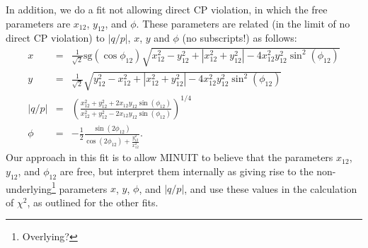 In addition, we do a fit not allowing direct CP violation, in which the
free parameters are $x_{12}$, $y_{12}$, and $\phi$. These parameters are related
(in the limit of no direct CP violation) to $|q/p|$, $x$, $y$ and $\phi$ (no subscripts!) as follows:
\begin{eqnarray}
x &=& \frac{1}{\sqrt{2}}\mathrm{sg}(\cos\phi_{12})
\sqrt{x_{12}^2 - y_{12}^2 + |x_{12}^2+y_{12}^2| - 4x_{12}^2y_{12}^2\sin^2(\phi_{12})} \\
%
y &=& \frac{1}{\sqrt{2}}
\sqrt{y_{12}^2 - x_{12}^2 + |x_{12}^2+y_{12}^2| - 4x_{12}^2y_{12}^2\sin^2(\phi_{12})} \\
%
|q/p| &=& \left(\frac{x_{12}^2+y_{12}^2+2x_{12}y_{12}\sin(\phi_{12})}
{x_{12}^2+y_{12}^2-2x_{12}y_{12}\sin(\phi_{12})}\right)^{1/4}\\
%
\phi &=& -\frac{1}{2}\frac{\sin(2\phi_{12})}{\cos(2\phi_{12})+\frac{y_{12}^2}{x_{12}^2}}.
\end{eqnarray}
Our approach in this fit is to allow MINUIT to believe that the parameters $x_{12}$, $y_{12}$,
and $\phi_{12}$ are free, but interpret them internally as giving rise to the 
non-underlying\footnote{Overlying?} parameters $x$, $y$, $\phi$, and $|q/p|$, and use these
values in the calculation of $\chi^2$, as outlined for the other fits. 

